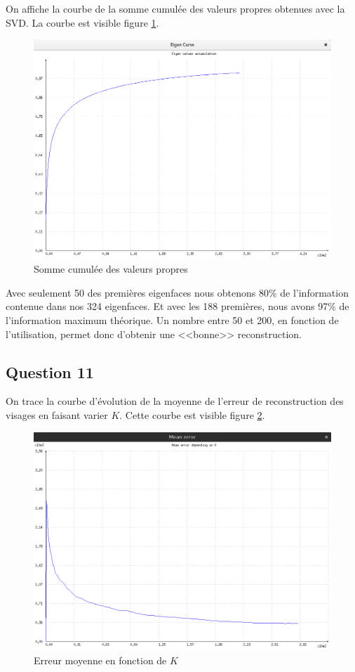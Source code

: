 \documentclass[a4paper]{article}
\begin{document}
On affiche la courbe de la somme cumulée des valeurs propres obtenues avec la SVD. La courbe est visible
figure \ref{q10}.

\begin{figure}
    \centering
    \includegraphics[width=\textwidth]{img/q10_eigen_values.png}
    \caption{Somme cumulée des valeurs propres}
    \label{q10}
\end{figure}

Avec seulement 50 des premières eigenfaces nous obtenons 80\% de l'information contenue dans nos 324
eigenfaces. Et avec les 188 premières, nous avons 97\% de l'information maximum théorique.
Un nombre entre 50 et 200, en fonction de l'utilisation, permet donc d'obtenir une <<bonne>> reconstruction.

\subsection{Question 11}

On trace la courbe d'évolution de la moyenne de l'erreur de reconstruction des visages en faisant varier $K$.
Cette courbe est visible figure \ref{q11}.

\begin{figure}
    \centering
    \includegraphics[width=\textwidth]{img/q11_mean_error.png}
    \caption{Erreur moyenne en fonction de $K$}
    \label{q11}
\end{figure}
\end{document}
